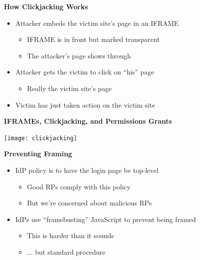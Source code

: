 \documentclass[helvetica]{seminar}
\newcommand{\heading}[1]{%
  \begin{center} 
    \large\bf 
    #1 
  \end{center} 
  \vspace{.4 in}}
\begin{document}
\begin{slide}
\heading{How Clickjacking Works}

\begin{itemize}
\item Attacker embeds the victim site's page in an IFRAME
  \begin{itemize}
  \item IFRAME is in front but marked transparent
  \item The attacker's page shows through
  \end{itemize}

\item Attacker gets the victim to click on ``his'' page
  \begin{itemize}
  \item Really the victim site's page
  \end{itemize}

\item Victim has just taken action on the victim site
\end{itemize}

\end{slide}


\begin{slide}
\heading{IFRAMEs, Clickjacking, and Permissions Grants}

\begin{center}
\texttt{[image: clickjacking]}
\end{center}

\end{slide}


\begin{slide}
\heading{Preventing Framing}

\begin{itemize}
\item IdP policy is to have the login page be top-level
  \begin{itemize}
  \item Good RPs comply with this policy
  \item But we're concerned about malicious RPs
  \end{itemize}

\item IdPs use ``framebusting'' JavaScript to prevent being framed
  \begin{itemize}
  \item This is harder than it sounds
  \item ... but standard procedure
  \end{itemize}


\end{itemize}

\end{slide}
\end{document}
